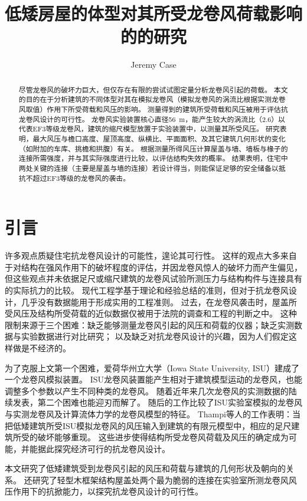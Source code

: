\documentclass{ctexart}
\title{低矮房屋的体型对其所受龙卷风荷载影响的的研究}
\author{Jeremy Case}
\date{}
\begin{document}
\maketitle

\begin{abstract}
尽管龙卷风的破坏力巨大，但仅存在有限的尝试试图定量分析龙卷风引起的荷载。
本文的目的在于分析建筑的不同体型对其在模拟龙卷风（模拟龙卷风的涡流比根据实测龙卷风取值）作用下所受荷载和风压的影响。
测量得到的建筑所受荷载和风压被用于评估抗龙卷风设计的可行性。
龙卷风实验装置核心直径\SI{56}{m}，能产生较大的涡流比（\num{2.6}）以代表EF3等级龙卷风，建筑的缩尺模型放置于实验装置中，以测量其所受风压。
研究表明，最大风压与檐口高度、屋顶高度、纵横比、平面面积、及其它建筑几何形状的变化（如附加的车库、挑檐和拱腹）有关。
根据测量所得风压计算屋盖与墙、墙板与椽子的连接所需强度，并与其实际强度进行比较，以评估结构失效的概率。
结果表明，住宅中两处关键的连接（主要是屋盖与墙的连接）若设计得当，则能保证足够的安全储备以抵抗不超过EF3等级的龙卷风的袭击。
\end{abstract}

\section{引言}
许多观点质疑住宅抗龙卷风设计的可能性，遑论其可行性。
这样的观点大多来自于对结构在强风作用下的破坏程度的评估，并因龙卷风惊人的破坏力而产生偏见，
但这些观点并未依据足尺或缩尺建筑的龙卷风试验所测压力与结构构件与连接具有的实际抗力的比较。
现代工程学基于理论和经验总结的准则，但对于抗龙卷风设计，几乎没有数据能用于形成实用的工程准则。
过去，在龙卷风袭击时，屋盖所受风压及结构所受荷载的近似数据仅被用于法院的调查和工程的判断之中。
这种限制来源于三个困难：缺乏能够测量龙卷风引起的风压和荷载的仪器；缺乏实测数据与实验数据进行对比研究；
以及缺乏对抗龙卷风设计的兴趣，因为人们假定这样做是不经济的。

为了克服上文第一个困难\cite{haan2008design}，爱荷华州立大学（Iowa State University, ISU）建成了一个龙卷风模拟装置。
ISU龙卷风装置能产生相对于建筑模型运动的龙卷风，也能调整多个参数以产生不同种类的龙卷风。
随着近年来几次龙卷风的实测数据的陆续发表，第二个困难也能迎刃而解了。
随后的工作比较了ISU实验室模拟的龙卷风与实测龙卷风及计算流体力学的龙卷风模型的特征。
Thampi等人的工作表明：当把低矮建筑所受ISU模拟龙卷风的风压输入到建筑的有限元模型中，相应的足尺建筑所受的破坏能够重现。
这些进步使得结构所受龙卷风荷载及风压的确定成为可能，并能据此探究经济可行的抗龙卷风设计。

本文研究了低矮建筑受到龙卷风引起的风压和荷载与建筑的几何形状及朝向的关系。
还研究了轻型木框架结构屋盖处两个最为脆弱的连接在实验室所测龙卷风风压作用下的抗掀能力，以探究抗龙卷风设计的可行性。
\end{document}
